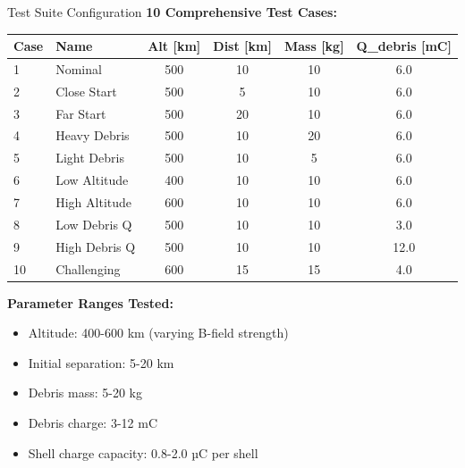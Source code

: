 \documentclass[aspectratio=169]{beamer}
\begin{document}
\begin{frame}{Test Suite Configuration}
\textbf{10 Comprehensive Test Cases:}

\begin{center}
\begin{tabular}{llcccc}
\toprule
\textbf{Case} & \textbf{Name} & \textbf{Alt [km]} & \textbf{Dist [km]} & \textbf{Mass [kg]} & \textbf{Q\_debris [mC]} \\
\midrule
1 & Nominal & 500 & 10 & 10 & 6.0 \\
2 & Close Start & 500 & 5 & 10 & 6.0 \\
3 & Far Start & 500 & 20 & 10 & 6.0 \\
4 & Heavy Debris & 500 & 10 & 20 & 6.0 \\
5 & Light Debris & 500 & 10 & 5 & 6.0 \\
6 & Low Altitude & 400 & 10 & 10 & 6.0 \\
7 & High Altitude & 600 & 10 & 10 & 6.0 \\
8 & Low Debris Q & 500 & 10 & 10 & 3.0 \\
9 & High Debris Q & 500 & 10 & 10 & 12.0 \\
10 & Challenging & 600 & 15 & 15 & 4.0 \\
\bottomrule
\end{tabular}
\end{center}

\vspace{0.3cm}
\textbf{Parameter Ranges Tested:}
\begin{itemize}
    \item Altitude: 400-600 km (varying B-field strength)
    \item Initial separation: 5-20 km
    \item Debris mass: 5-20 kg
    \item Debris charge: 3-12 mC
    \item Shell charge capacity: 0.8-2.0 µC per shell
\end{itemize}
\end{frame}
\end{document}
